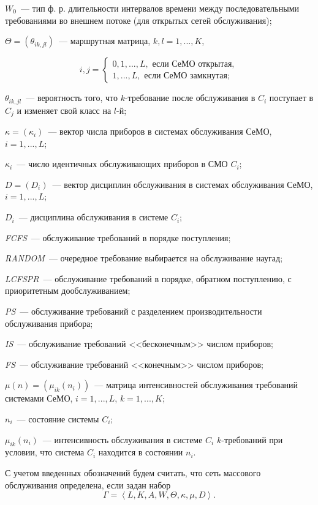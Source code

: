 $W_0$~--- тип ф. р. длительности интервалов времени между последовательными требованиями во внешнем потоке (для открытых сетей обслуживания);

$\Theta=(\theta_{ik,jl})$~--- маршрутная матрица, $k,l=1,...,K$,

\[i,j = \left\{
 \begin{array}{l}
  0,1,...,L, \text{ если СеМО открытая}, \\
  1,...,L, \text{ если СеМО замкнутая};
 \end{array}
\right.\]

$\theta_{ik,jl}$~--- вероятность того, что $k$-требование после обслуживания в $C_i$ поступает в $C_j$ и изменяет свой класс на $l$-й;

$\kappa=(\kappa_i)$~--- вектор числа приборов в системах обслуживания СеМО, $i=1,...,L$;

$\kappa_i$~--- число идентичных обслуживающих приборов в СМО $C_i$;

$D=(D_i)$~--- вектор дисциплин обслуживания в системах обслуживания СеМО, $i=1,...,L$;

$D_i$~--- дисциплина обслуживания в системе $C_i$;

\textit{FCFS}~--- обслуживание требований в порядке поступления;

\textit{RANDOM}~--- очередное требование выбирается на обслуживание наугад;

\textit{LCFSPR}~--- обслуживание требований в порядке, обратном поступлению, с приоритетным дообслуживанием;

\textit{PS}~--- обслуживание требований с разделением производительности обслуживания прибора;

\textit{IS}~--- обслуживание требований <<бесконечным>> числом приборов;

\textit{FS}~--- обслуживание требований <<конечным>> числом приборов;

$\mu(n)=(\mu_{ik}(n_i))$~--- матрица интенсивностей обслуживания требований системами СеМО, $i=1,...,L$, $k=1,...,K$;

$n_i$~--- состояние системы $C_i$;

$\mu_{ik}(n_i)$~--- интенсивность обслуживания в системе $C_i$ $k$-требований при условии, что система $C_i$ находится в состоянии $n_i$.

С учетом введенных обозначений будем считать, что сеть массового обслуживания  определена, если задан набор
\begin{equation*}
\Gamma=\left< L,K,A,W,\Theta,\kappa,\mu,D \right>.
\end{equation*}

